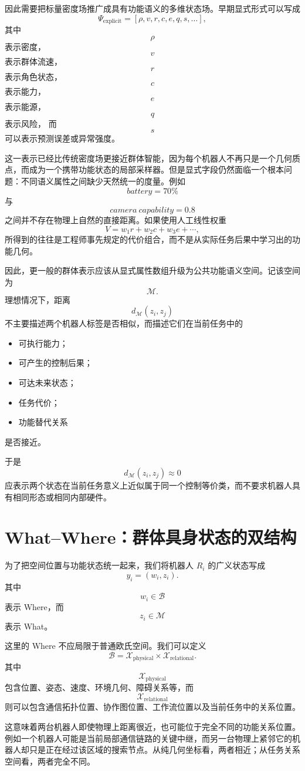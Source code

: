 因此需要把标量密度场推广成具有功能语义的多维状态场。早期显式形式可以写成
\[
\Psi_{\mathrm{explicit}}
=
[
\rho,
v,
r,
c,
e,
q,
s,\ldots
],
\]
其中
\[
\rho
\]
表示密度，
\[
v
\]
表示群体流速，
\[
r
\]
表示角色状态，
\[
c
\]
表示能力，
\[
e
\]
表示能源，
\[
q
\]
表示风险，
而
\[
s
\]
可以表示预测误差或异常强度。

这一表示已经比传统密度场更接近群体智能，因为每个机器人不再只是一个几何质点，而成为一个携带功能状态的局部采样器。但是显式字段仍然面临一个根本问题：不同语义属性之间缺少天然统一的度量。例如
\[
battery=70\%
\]
与
\[
camera\ capability=0.8
\]
之间并不存在物理上自然的直接距离。如果使用人工线性权重
\[
V
=
w_1r+w_2c+w_3e+\cdots,
\]
所得到的往往是工程师事先规定的代价组合，而不是从实际任务后果中学习出的功能几何。

因此，更一般的群体表示应该从显式属性数组升级为公共功能语义空间。记该空间为
\[
\mathcal M.
\]
理想情况下，距离
\[
d_{\mathcal M}(z_i,z_j)
\]
不主要描述两个机器人标签是否相似，而描述它们在当前任务中的
\begin{itemize}
    \item 可执行能力；
    \item 可产生的控制后果；
    \item 可达未来状态；
    \item 任务代价；
    \item 功能替代关系
\end{itemize}
是否接近。

于是
\[
\boxed{
d_{\mathcal M}(z_i,z_j)\approx0
}
\]
应表示两个状态在当前任务意义上近似属于同一个控制等价类，而不要求机器人具有相同形态或相同内部硬件。


\section{What--Where：群体具身状态的双结构}

为了把空间位置与功能状态统一起来，我们将机器人 $R_i$ 的广义状态写成
\[
y_i
=
(w_i,z_i).
\]
其中
\[
w_i\in\mathcal B
\]
表示 Where，而
\[
z_i\in\mathcal M
\]
表示 What。

这里的 Where 不应局限于普通欧氏空间。我们可以定义
\[
\mathcal B
=
\mathcal X_{\mathrm{physical}}
\times
\mathcal X_{\mathrm{relational}}.
\]
其中
\[
\mathcal X_{\mathrm{physical}}
\]
包含位置、姿态、速度、环境几何、障碍关系等，而
\[
\mathcal X_{\mathrm{relational}}
\]
则可以包含通信拓扑位置、协作图位置、工作流位置以及当前任务中的关系位置。

这意味着两台机器人即使物理上距离很近，也可能位于完全不同的功能关系位置。例如一个机器人可能是当前局部通信链路的关键中继，而另一台物理上紧邻它的机器人却只是正在经过该区域的搜索节点。从纯几何坐标看，两者相近；从任务关系空间看，两者完全不同。

